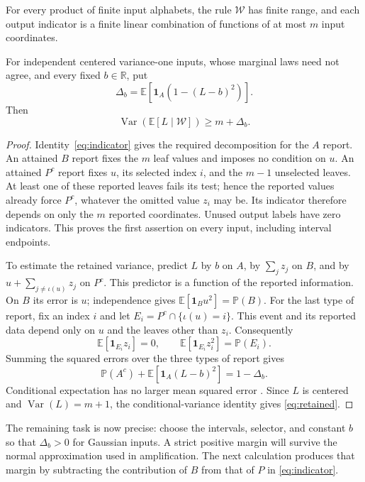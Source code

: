 \begin{lemma}\label{lem:report}
For every product of finite input alphabets, the rule $\mathcal W$
has finite range, and each output indicator is a finite linear
combination of functions of at most $m$ input coordinates.

For independent centered variance-one inputs, whose marginal laws need
not agree, and every fixed $b\in\mathbb R$, put
\[
 \Delta_b=\mathbb E[\mathbf1_A(1-(L-b)^2)].
\]
Then
\begin{equation}\label{eq:retained}
 \operatorname{Var}(\mathbb E[L\mid\mathcal W])\ge m+\Delta_b.
\end{equation}
\end{lemma}

\begin{proof}
Identity~\eqref{eq:indicator} gives the required decomposition
for the $A$ report.  An attained $B$ report fixes the $m$ leaf values
and imposes no condition on $u$.  An attained $P^c$ report fixes $u$,
its selected index $i$, and the $m-1$ unselected leaves.  At least one
of these reported leaves fails its test; hence the reported values
already force $P^c$, whatever the omitted value $z_i$ may be.  Its
indicator therefore depends on only the $m$ reported coordinates.
Unused output labels have zero indicators.  This proves the first
assertion on every input, including interval endpoints.

To estimate the retained variance, predict $L$ by $b$ on $A$, by
$\sum_jz_j$ on $B$, and by $u+\sum_{j\ne\iota(u)}z_j$ on $P^c$.
This predictor is a function of the reported information.  On $B$
its error is $u$; independence gives
$\mathbb E[\mathbf1_Bu^2]=\mathbb P(B)$.
For the last type of report, fix an index $i$ and let
$E_i=P^c\cap\{\iota(u)=i\}$.  This event and its reported data
depend only on $u$ and the leaves other than $z_i$.  Consequently
\[
 \mathbb E[\mathbf1_{E_i}z_i]=0,
 \qquad
 \mathbb E[\mathbf1_{E_i}z_i^2]=\mathbb P(E_i).
\]
Summing the squared errors over the three types of report gives
\[
 \mathbb P(A^c)+\mathbb E[\mathbf1_A(L-b)^2]=1-\Delta_b.
\]
Conditional expectation has no larger mean squared error
\cite[Theorems~4.1.13 and 4.1.15]{Durrett}.  Since $L$ is centered and
$\operatorname{Var}(L)=m+1$, the conditional-variance identity gives
\eqref{eq:retained}.
\end{proof}

The remaining task is now precise: choose the intervals, selector, and
constant $b$ so that $\Delta_b>0$ for Gaussian inputs.  A strict
positive margin will survive the normal approximation used in
amplification.  The next calculation produces that margin by subtracting
the contribution of $B$ from that of $P$ in
\eqref{eq:indicator}.

